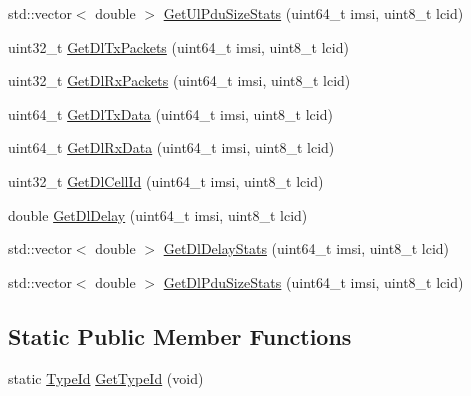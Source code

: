 \begin{DoxyCompactItemize}
\item 
std\+::vector$<$ double $>$ \hyperlink{classns3_1_1RadioBearerStatsCalculator_a4aa7fde1ae54a5b6683cb7c12ea1d157}{Get\+Ul\+Pdu\+Size\+Stats} (uint64\+\_\+t imsi, uint8\+\_\+t lcid)
\item 
uint32\+\_\+t \hyperlink{classns3_1_1RadioBearerStatsCalculator_a55f9b9c664e1389ad9edf704e385299c}{Get\+Dl\+Tx\+Packets} (uint64\+\_\+t imsi, uint8\+\_\+t lcid)
\item 
uint32\+\_\+t \hyperlink{classns3_1_1RadioBearerStatsCalculator_a164d36dc82ed7dae2f4d748da502589a}{Get\+Dl\+Rx\+Packets} (uint64\+\_\+t imsi, uint8\+\_\+t lcid)
\item 
uint64\+\_\+t \hyperlink{classns3_1_1RadioBearerStatsCalculator_a12f2d1946eb125e42611ecdc31079150}{Get\+Dl\+Tx\+Data} (uint64\+\_\+t imsi, uint8\+\_\+t lcid)
\item 
uint64\+\_\+t \hyperlink{classns3_1_1RadioBearerStatsCalculator_a80ec1463cd053d8deebda8498d2b864e}{Get\+Dl\+Rx\+Data} (uint64\+\_\+t imsi, uint8\+\_\+t lcid)
\item 
uint32\+\_\+t \hyperlink{classns3_1_1RadioBearerStatsCalculator_ab568573342dc1edd7c960586d93670d7}{Get\+Dl\+Cell\+Id} (uint64\+\_\+t imsi, uint8\+\_\+t lcid)
\item 
double \hyperlink{classns3_1_1RadioBearerStatsCalculator_abaf8e1661efe91eb1fd8e17340970681}{Get\+Dl\+Delay} (uint64\+\_\+t imsi, uint8\+\_\+t lcid)
\item 
std\+::vector$<$ double $>$ \hyperlink{classns3_1_1RadioBearerStatsCalculator_a0466fe56fc0e027c37ab5a233a5ad8d6}{Get\+Dl\+Delay\+Stats} (uint64\+\_\+t imsi, uint8\+\_\+t lcid)
\item 
std\+::vector$<$ double $>$ \hyperlink{classns3_1_1RadioBearerStatsCalculator_a18424d44f20a70d83806b83a5708b50a}{Get\+Dl\+Pdu\+Size\+Stats} (uint64\+\_\+t imsi, uint8\+\_\+t lcid)
\end{DoxyCompactItemize}
\subsection*{Static Public Member Functions}
\begin{DoxyCompactItemize}
\item 
static \hyperlink{classns3_1_1TypeId}{Type\+Id} \hyperlink{classns3_1_1RadioBearerStatsCalculator_a2aacc2d4dcc4377e3a96e0891d867b60}{Get\+Type\+Id} (void)
\end{DoxyCompactItemize}
